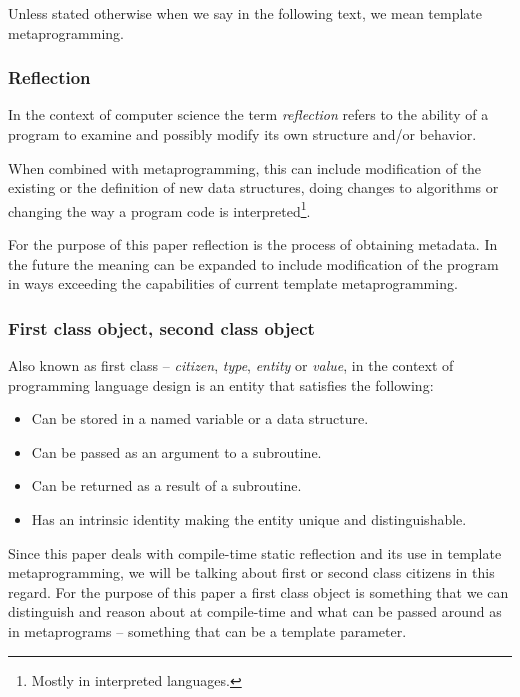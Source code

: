 Unless stated otherwise when we say  in the following text,
we mean template metaprogramming.

\subsubsection{Reflection}

In the context of computer science
the term {\em reflection} refers to the ability of a program to examine
and possibly modify its own structure and/or behavior.

When combined with metaprogramming, this can include modification of the existing
or the definition of new data structures, doing changes to algorithms or changing the way
a program code is interpreted\footnote{Mostly in interpreted languages.}.

For the purpose of this paper reflection is the process of obtaining metadata.
In the future the meaning can be expanded to include modification of the program
in ways exceeding the capabilities of current template metaprogramming.

\subsubsection{First class object, second class object}
\label{term-first-class}

Also known as first class -- {\em citizen}, {\em type}, {\em entity} or {\em value},
in the context of programming language design is an entity that satisfies
the following:

\begin{itemize}
	\item{Can be stored in a named variable or a data structure.}
	\item{Can be passed as an argument to a subroutine.}
	\item{Can be returned as a result of a subroutine.}
	\item{Has an intrinsic identity making the entity unique and distinguishable.}
\end{itemize}

Since this paper deals with compile-time static reflection and its use
in template metaprogramming, we will be talking about first or second class
citizens in this regard. 
For the purpose of this paper a first class object is something that
we can distinguish and reason about at compile-time and what can be passed around
as  in metaprograms -- something that can be a template parameter.

